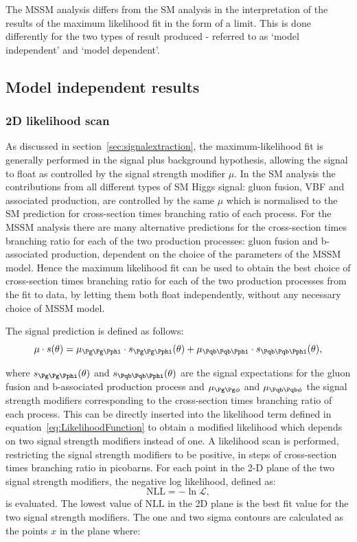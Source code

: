 The \ac{MSSM} analysis differs from the \ac{SM} analysis in the
interpretation of the results of the maximum likelihood fit in the form of a limit. This
is done differently for the two types of result produced - referred to as `model 
independent' and `model dependent'. 

\subsection{Model independent results}
\label{sec:modelindependent}

\subsubsection{2D likelihood scan}

As discussed in section~\ref{sec:signalextraction}, the maximum-likelihood fit
is generally performed in the signal plus background hypothesis, allowing the
signal to float as controlled by the signal strength modifier $\mu$. In the
\ac{SM} analysis the contributions from all different types of \ac{SM} Higgs
signal: gluon fusion, \ac{VBF} and associated production, are controlled by the
same $\mu$ which is normalised to the \ac{SM} prediction for cross-section times
branching ratio of each process. For the \ac{MSSM}
analysis there are many alternative predictions for the cross-section times
branching ratio for each of the two production processes: gluon fusion and
b-associated production, dependent on the choice of the parameters of the
\ac{MSSM} model. Hence the maximum likelihood fit can be used to obtain the best
choice of cross-section times branching ratio for each of the two production
processes from the fit to data, by letting them both float independently,
without any necessary choice of \ac{MSSM} model.

The signal prediction is defined as follows:
\begin{equation}
\mu \cdot s(\theta) = \mu_{\Pg\Pg\Pphi} \cdot s_{\Pg\Pg\Pphi}(\theta) + \mu_{\Pqb\Pqb\Pphi}
\cdot s_{\Pqb\Pqb\Pphi}(\theta) ,
\end{equation}

where $s_{\Pg\Pg\Pphi}(\theta)$ and $s_{\Pqb\Pqb\Pphi}(\theta)$ are the signal expectations for the gluon
fusion and b-associated production process and $\mu_{\Pg\Pg\phi}$ and
$\mu_{\Pqb\Pqb\phi}$
the signal strength modifiers corresponding to the cross-section times branching
ratio of each process. This can be directly inserted into the likelihood
term defined in equation~\ref{eq:LikelihoodFunction} to obtain a modified
likelihood which depends on two signal strength modifiers instead of one. A
likelihood scan is performed, restricting the signal strength modifiers to
be positive, in steps of cross-section times branching ratio in picobarns. For
each point in the 2-D plane of the two signal strength modifiers, the negative
log likelihood, defined as:
\begin{equation}
\mathrm{NLL} = - \ln \mathcal{L} ,  
\end{equation}
is evaluated. The lowest value of $\mathrm{NLL}$ in the 2D plane is the best fit value
for the two signal strength modifiers. The one and two sigma contours are
calculated as the points $x$ in the plane where:

